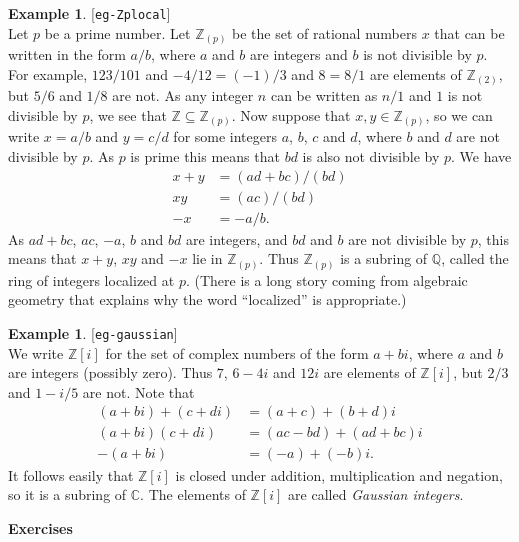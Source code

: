\documentclass{amsart}
\newcommand{\lbl}[1]{\label{#1}\textup{[\texttt{#1}]}\ \\}
\newcommand{\lbl}{\label}
\newcommand{\C}         {{\mathbb{C}}}
\newcommand{\Q}         {{\mathbb{Q}}}
\newcommand{\Z}         {{\mathbb{Z}}}
\newcommand{\Zpl}       {{\mathbb{Z}_{(p)}}}
\newcommand{\sse}       {\subseteq}
\renewcommand{\:}{\colon}
\theoremstyle{definition}
\newtheorem{example}[theorem]{Example}
\begin{document}
\begin{example}\lbl{eg-Zplocal}
 Let $p$ be a prime number.  Let $\Zpl$ be the set of rational numbers
 $x$ that can be written in the form $a/b$, where $a$ and $b$ are
 integers and $b$ is not divisible by $p$.  For example, $123/101$ and
 $-4/12=(-1)/3$ and $8=8/1$ are elements of $\Z_{(2)}$, but $5/6$ and
 $1/8$ are not.  As any integer $n$ can be written as $n/1$ and $1$ is
 not divisible by $p$, we see that $\Z\sse\Zpl$.  Now suppose that
 $x,y\in\Zpl$, so we can write $x=a/b$ and $y=c/d$ for some integers
 $a$, $b$, $c$ and $d$, where $b$ and $d$ are not divisible by $p$.
 As $p$ is prime this means that $bd$ is also not divisible by $p$.
 We have
 \begin{align*}
  x+y &= (ad+bc)/(bd) \\
  xy  &= (ac)/(bd)    \\
  -x  &= -a/b.
 \end{align*}
 As $ad+bc$, $ac$, $-a$, $b$ and $bd$ are integers, and $bd$ and $b$
 are not divisible by $p$, this means that $x+y$, $xy$ and $-x$ lie in
 $\Zpl$.  Thus $\Zpl$ is a subring of $\Q$, called the ring of
 integers localized at $p$.  (There is a long story coming from
 algebraic geometry that explains why the word ``localized'' is
 appropriate.)
\end{example}
\begin{example}\lbl{eg-gaussian}
 We write $\Z[i]$ for the set of complex numbers of the form $a+bi$,
 where $a$ and $b$ are integers (possibly zero).  Thus $7$, $6-4i$ and
 $12i$ are elements of $\Z[i]$, but $2/3$ and $1-i/5$ are not.  Note
 that 
 \begin{align*}
  (a+bi)+(c+di) &= (a+c) + (b+d)i \\
  (a+bi)(c+di) &= (ac-bd) + (ad+bc)i \\
  -(a+bi) &= (-a) + (-b)i.
 \end{align*}
 It follows easily that $\Z[i]$ is closed under addition,
 multiplication and negation, so it is a subring of $\C$.  The
 elements of $\Z[i]$ are called \emph{Gaussian integers}.  
\end{example}


\begin{center}
 \Large \textbf{Exercises}
\end{center}
\end{document}
